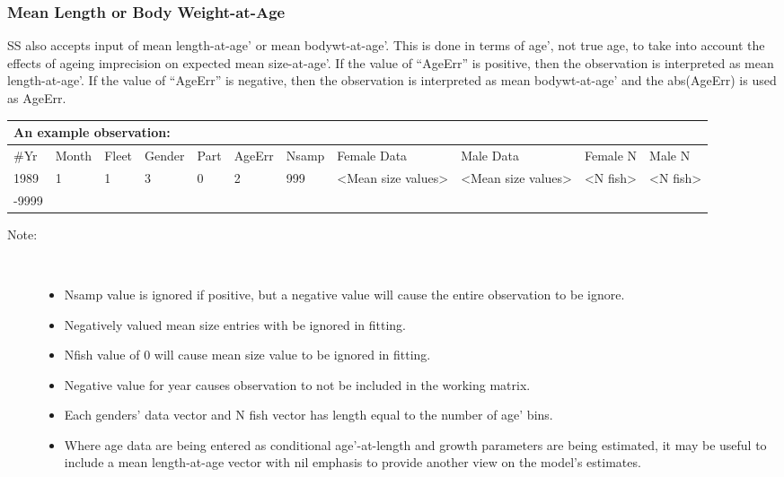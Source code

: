 \subsubsection{Mean Length or Body Weight-at-Age}
SS also accepts input of mean length-at-age’ or mean bodywt-at-age’.  This is done in terms of age’, not true age, to take into account the effects of ageing imprecision on expected mean size-at-age’.  If the value of “AgeErr” is positive, then the observation is interpreted as mean length-at-age’.  If the value of “AgeErr” is negative, then the observation is interpreted as mean bodywt-at-age’ and the abs(AgeErr) is used as AgeErr.

\begin{center}
	\begin{tabular}{p{1cm} p{1cm} p{1cm} p{1cm} p{1cm} p{1cm} p{1cm} p{1cm} p{1cm} p{1cm} p{1cm}}
		\multicolumn{11}{l}{An example observation:}\\
		\hline
		\#Yr & Month & Fleet & Gender & Part & AgeErr & Nsamp & Female Data & Male Data & Female N & Male N \\
		\hline
		1989 & 1 & 1 & 3 & 0 & 2 & 999 &<Mean size values> & <Mean size values> & <N fish> & <N fish>\\
		-9999 & \multicolumn{10}{l}{}\\
		\hline
	\end{tabular}
\end{center}

\begin{description}
	\item[Note:]\
	\begin{itemize}
		\item Nsamp value is ignored if positive, but a negative value will cause the entire observation to be ignore.
		\item Negatively valued mean size entries with be ignored in fitting.
		\item Nfish value of 0 will cause mean size value to be ignored in fitting.
		\item Negative value for year causes observation to not be included in the working matrix.
		\item Each genders' data vector and N fish vector has length equal to the number of age' bins.
		\item Where age data are being entered as conditional age’-at-length and growth parameters are being estimated, it may be useful to include a mean length-at-age vector with nil emphasis to provide another view on the model’s estimates.
		
	\end{itemize}
\end{description}

